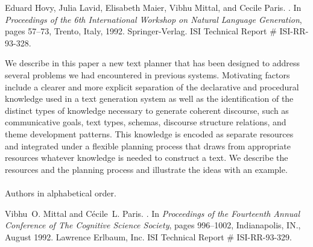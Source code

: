 \begin{thebibliography}{10}
Eduard Hovy, Julia Lavid, Elisabeth Maier, Vibhu Mittal, and Cecile Paris.
.
\newblock In {\em Proceedings of the 6th International Workshop on Natural
  Language Generation}, pages 57--73, Trento, Italy, 1992. Springer-Verlag.
\newblock ISI Technical Report \# ISI-RR-93-328.

{\leftskip=0.1in\rightskip=0.1in\begin{small}\par{}We
  describe in this paper a new text planner that has been designed to address
  several problems we had encountered in previous systems. Motivating factors
  include a clearer and more explicit separation of the declarative and
  procedural knowledge used in a text generation system as well as the
  identification of the distinct types of knowledge necessary to generate
  coherent discourse, such as communicative goals, text types, schemas,
  discourse structure relations, and theme development patterns. This knowledge
  is encoded as separate resources and integrated under a flexible planning
  process that draws from appropriate resources whatever knowledge is needed to
  construct a text. We describe the resources and the planning process and
  illustrate the ideas with an example. \\ \\ Authors in alphabetical
  order.\end{small}\par}
\noindent\hspace*{\itemindent}{\leftskip=0.1in\rightskip=0.1in\hrulefill}

Vibhu~O. Mittal and C{\'e}cile~L. Paris.
.
\newblock In {\em Proceedings of the Fourteenth Annual Conference of The
  Cognitive Science Society}, pages 996--1002, Indianapolis, IN., August 1992.
  Lawrence Erlbaum, Inc.
\newblock ISI Technical Report \# ISI-RR-93-329.


\end{thebibliography}
